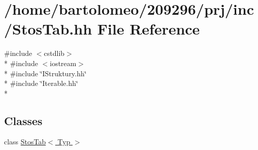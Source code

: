 \hypertarget{_stos_tab_8hh}{\section{/home/bartolomeo/209296/prj/inc/\-Stos\-Tab.hh File Reference}
\label{_stos_tab_8hh}
}
{\ttfamily \#include $<$cstdlib$>$}\\*
{\ttfamily \#include $<$iostream$>$}\\*
{\ttfamily \#include \char`\"{}I\-Struktury.\-hh\char`\"{}}\\*
{\ttfamily \#include \char`\"{}Iterable.\-hh\char`\"{}}\\*
\subsection*{Classes}
\begin{DoxyCompactItemize}
\item 
class \hyperlink{class_stos_tab}{Stos\-Tab$<$ Typ $>$}
\end{DoxyCompactItemize}
